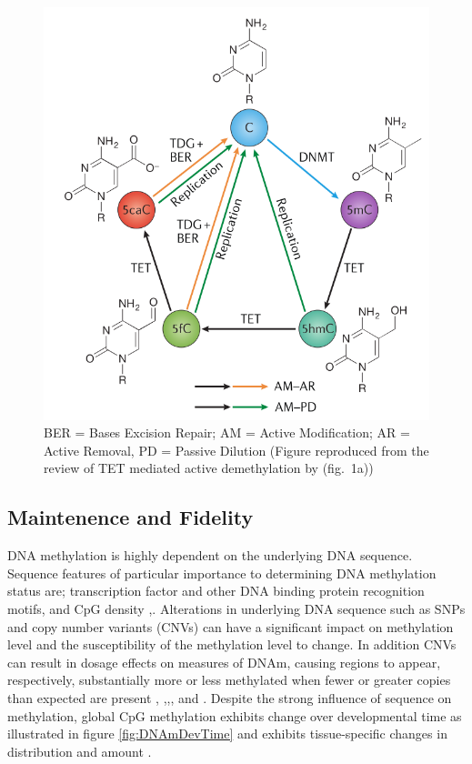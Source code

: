 \documentclass[]{book}
\begin{document}
\begin{figure}

{\centering \includegraphics[width=0.6\linewidth]{figs/Wu2017TETsDNAmCycle} 

}

\caption{BER = Bases Excision Repair; AM = Active Modification; AR = Active Removal, PD = Passive Dilution (Figure reproduced from the review of TET mediated active demethylation by \citet{Wu2017} (fig.~1a))}\label{fig:Wu2017TETsDNAmCycle}
\end{figure}



\hypertarget{maintenence-and-fidelity}{%
\subsection{Maintenence and Fidelity}\label{maintenence-and-fidelity}}

DNA methylation is highly dependent on the underlying DNA sequence. Sequence features of particular importance to determining DNA methylation status are; transcription factor and other DNA binding protein recognition motifs, and CpG density \citep{Lienert2011},\citep{Ziller2013}. Alterations in underlying DNA sequence such as SNPs and copy number variants (CNVs) can have a significant impact on methylation level and the susceptibility of the methylation level to change. In addition CNVs can result in dosage effects on measures of DNAm, causing regions to appear, respectively, substantially more or less methylated when fewer or greater copies than expected are present \citep{Boks2009}, \citep{Kerkel2008},\citep{Schalkwyk2010},\citep{Shoemaker2010}, and \citep{Bell2017a}. Despite the strong influence of sequence on methylation, global CpG methylation exhibits change over developmental time as illustrated in figure \ref{fig:DNAmDevTime} and exhibits tissue-specific changes in distribution and amount \citep{Ziller2013}.
\end{document}
